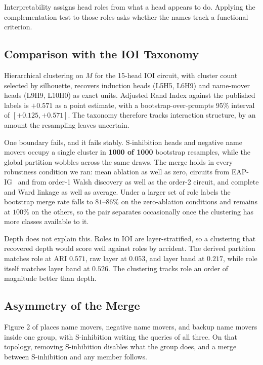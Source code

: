 \documentclass{article}
\begin{document}
Interpretability assigns head roles from what a head appears to do. Applying the
complementation test to those roles asks whether the names track a functional criterion.

\subsection{Comparison with the IOI Taxonomy}

Hierarchical clustering on $M$ for the 15-head IOI circuit, with cluster count selected by
silhouette, recovers induction heads (L5H5, L6H9) and name-mover heads (L9H9, L10H0) as
exact units. Adjusted Rand Index against the published labels is $+0.571$ as a point
estimate, with a bootstrap-over-prompts 95\% interval of $[+0.125, +0.571]$. The taxonomy
therefore tracks interaction structure, by an amount the resampling leaves uncertain.

One boundary fails, and it fails stably. S-inhibition heads and negative name movers occupy
a single cluster in \textbf{1000 of 1000} bootstrap resamples, while the global partition
wobbles across the same draws. The merge holds in every robustness condition we ran: mean
ablation as well as zero, circuits from EAP-IG~\citep{hanna2024faith} and from order-1 Walsh
discovery as well as
the order-2 circuit, and complete and Ward linkage as well as average. Under a larger set of
role labels the bootstrap merge rate falls to $81$--$86\%$ on the zero-ablation conditions
and remains at $100\%$ on the others, so the pair separates occasionally once the clustering
has more classes available to it.

Depth does not explain this. Roles in IOI are layer-stratified, so a clustering that
recovered depth would score well against roles by accident. The derived partition matches
role at ARI $0.571$, raw layer at $0.053$, and layer band at $0.217$, while role itself
matches layer band at $0.526$. The clustering tracks role an order of magnitude better than
depth.

\subsection{Asymmetry of the Merge}

Figure 2 of \citet{wang2022ioi} places name movers, negative name movers, and backup name
movers inside one group, with S-inhibition writing the queries of all three. On that
topology, removing S-inhibition disables what the group does, and a merge between
S-inhibition and any member follows.
\end{document}
